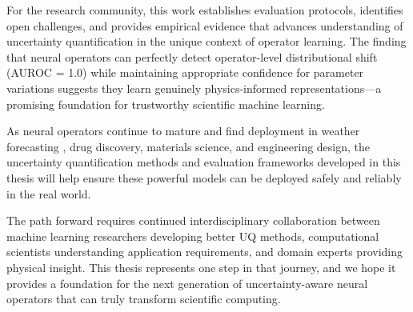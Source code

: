 For the research community, this work establishes evaluation protocols, identifies open challenges, and provides empirical evidence that advances understanding of uncertainty quantification in the unique context of operator learning. The finding that neural operators can perfectly detect operator-level distributional shift (AUROC = 1.0) while maintaining appropriate confidence for parameter variations suggests they learn genuinely physics-informed representations—a promising foundation for trustworthy scientific machine learning.

As neural operators continue to mature and find deployment in weather forecasting \cite{weyn2020improving}, drug discovery, materials science, and engineering design, the uncertainty quantification methods and evaluation frameworks developed in this thesis will help ensure these powerful models can be deployed safely and reliably in the real world.

The path forward requires continued interdisciplinary collaboration between machine learning researchers developing better UQ methods, computational scientists understanding application requirements, and domain experts providing physical insight. This thesis represents one step in that journey, and we hope it provides a foundation for the next generation of uncertainty-aware neural operators that can truly transform scientific computing.